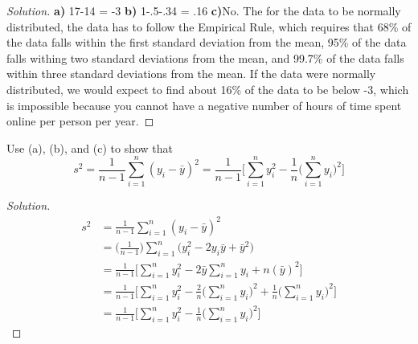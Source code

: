\documentclass[10pt]{article}
\newenvironment{problem}[2][Problem]{\begin{trivlist}
		\item[\hskip \labelsep {\bfseries #1}\hskip \labelsep {\bfseries #2.}]}{\end{trivlist}}
\newenvironment{solution}{\begin{proof}[Solution]}{\end{proof}}
\begin{document}
	\begin{solution}\quad\newline
        \textbf{a)} 17-14 = -3
        \newline\textbf{b)} 1-.5-.34 =  .16
        \newline\textbf{c)}No. The for the data to be normally distributed, the data has to follow the Empirical Rule, which requires that 68\% of the data falls within the first standard deviation from the mean, 95\% of the data falls withing two standard deviations from the mean, and 99.7\% of the data falls within three standard deviations from the mean. If the data were normally distributed, we would expect to find about 16\% of the data to be below -3, which is impossible because you cannot have a negative number of hours of time spent online per person per year.
        
	\end{solution}
	
	
	\vspace{0.15in} %
	
	\begin{problem}{1.11}
	Use (a), (b), and (c) to show that \newline
	$$s^2 = \frac{1}{n-1}\sum_{i=1}^{n} (y_{i} - \bar{y})^2 = \frac{1}{n-1}\Bigg[\sum_{i=1}^{n} y_{i}^{2} - \frac{1}{n}\Big(\sum_{i=1}^{n}y_{i}\Big)^2\Bigg]$$
	\end{problem}
    
    \begin{solution}\quad\newline
    \begin{equation}\nonumber
\begin{split}
    s^2 &= \frac{1}{n-1}\sum_{i=1}^{n}(y_{i} - \bar{y})^2\\
    & =\Big(\frac{1}{n-1}\Big)\sum_{i=1}^{n}\Big(y_i^2 -2y_i \bar y + \bar y^2 \Big)\\
    & =\frac{1}{n-1}\Big[\sum_{i=1}^{n}y_i^2 - 2\bar y\sum_{i=1}^n y_i + n(\bar y) ^2\Big]\\
    &= \frac{1}{n-1}\Big[\sum_{i=1}^{n}y_i^2 -  \frac{2}{n}\big(\sum_{i=1}^{n}y_i\big)^2 + \frac{1}{n}\big(\sum_{i=1}^{n}y_i\big)^2\Big]\\
    &= \frac{1}{n-1}\Bigg[\sum_{i=1}^{n} y_{i}^{2} - \frac{1}{n}\Big(\sum_{i=1}^{n}y_{i}\Big)^2\Bigg]
    \end{split}
\end{equation}

    \end{solution}
	
\end{document}
